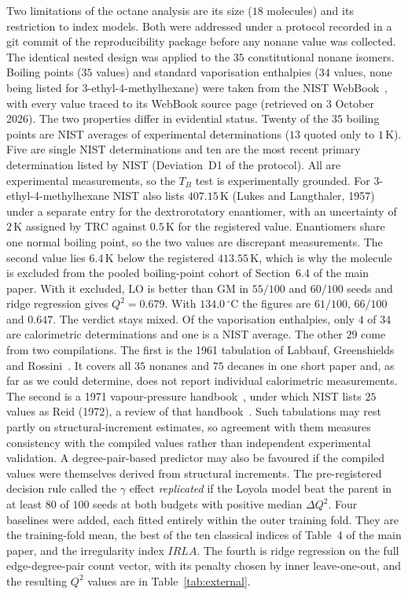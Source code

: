 \documentclass[a5paper, 10pt]{article}
\theoremstyle{plain}
\theoremstyle{remark}
\theoremstyle{definition}
\begin{document}
Two limitations of the octane analysis are its size ($18$ molecules) and
its restriction to index models. Both were addressed under a protocol
recorded in a git commit of the reproducibility package before any
nonane value was collected. The identical nested design was applied to
the $35$ constitutional nonane isomers. Boiling points ($35$ values) and
standard vaporisation enthalpies ($34$ values, none being listed for
3-ethyl-4-methylhexane) were taken from the NIST
WebBook~\cite{NISTWebBook}, with every value traced to its WebBook
source page (retrieved on 3 October 2026). The two properties differ in evidential status. Twenty of
the $35$ boiling points are NIST averages of experimental
determinations ($13$ quoted only to $1$\,K). Five are single NIST
determinations and ten are the most recent primary determination listed
by NIST (Deviation~D1 of the protocol). All are experimental
measurements, so the $T_B$ test is experimentally grounded. For
3-ethyl-4-methylhexane NIST also lists $407.15$\,K (Lukes and Langthaler, 1957) under a separate entry for the dextrorotatory enantiomer, with an uncertainty of $2$\,K assigned by TRC against $0.5$\,K for the registered value. Enantiomers share one normal boiling point, so the two values are discrepant measurements. The second value lies $6.4$\,K below the
registered $413.55$\,K, which is why the molecule is excluded from the
pooled boiling-point cohort of Section~6.4 of the main paper. With it
excluded, LO is better than GM in $55/100$ and $60/100$ seeds and ridge
regression gives $Q^2 = 0.679$. With $134.0\,^{\circ}$C the figures are
$61/100$, $66/100$ and $0.647$. The verdict stays mixed.
Of the vaporisation enthalpies, only $4$ of $34$ are calorimetric
determinations and one is a NIST average. The other $29$ come from two
compilations. The first is the 1961 tabulation of
Labbauf, Greenshields and Rossini~\cite{LabaufGreenshieldsRossini1961}.
It covers all $35$ nonanes and $75$ decanes in one short paper and, as far as we could determine, does not report individual calorimetric measurements. The second is a 1971 vapour-pressure handbook~\cite{WilhoitZwolinski1971}, under which NIST lists $25$ values as Reid (1972), a review of that handbook~\cite{Reid1972}. Such tabulations may rest
partly on structural-increment estimates, so agreement with them
measures consistency with the compiled values rather than independent
experimental validation. A degree-pair-based predictor may also be
favoured if the compiled values were themselves derived from structural
increments. The pre-registered
decision rule called the $\gamma$ effect \emph{replicated} if the Loyola
model beat the parent in at least $80$ of $100$ seeds at both budgets
with positive median $\Delta Q^2$. Four baselines were added, each
fitted entirely within the outer training fold. They are the
training-fold mean, the best of the ten classical indices of Table~4 of the main paper, and the irregularity index $IRLA$. The fourth is ridge
regression on the full edge-degree-pair count vector, with its penalty
chosen by inner leave-one-out, and the resulting $Q^2$ values are in
Table~\ref{tab:external}.
\end{document}
